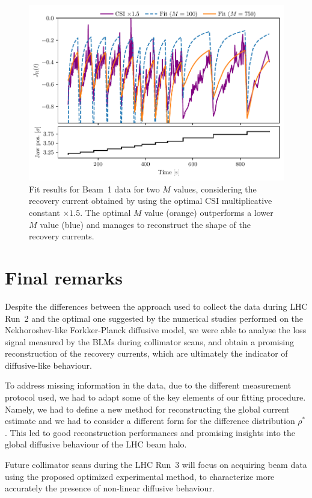 \begin{figure}[hpt]
    \centering
    \includegraphics[trim={0 2.5mm 0 3mm}, clip, width=0.95\columnwidth]{5_Diffusion_measurement_LHC/figs/fifth.pdf}
    \caption{Fit results for Beam~1 data for two $M$ values, considering the recovery current obtained by using the optimal CSI multiplicative constant $\times 1.5$. The optimal $M$ value (orange) outperforms a lower $M$ value (blue) and manages to reconstruct the shape of the recovery currents.}
    \label{fig:fifth}
\end{figure}
%
\section{Final remarks}\label{sec:4:remarks}
%
Despite the differences between the approach used to collect the data during LHC Run~2 and the optimal one suggested by the numerical studies performed on the Nekhoroshev-like Forkker-Planck diffusive model, we were able to analyse the loss signal measured by the BLMs during collimator scans, and obtain a promising reconstruction of the recovery currents, which are ultimately the indicator of diffusive-like behaviour.

To address missing information in the data, due to the different measurement protocol used, we had to adapt some of the key elements of our fitting procedure. Namely, we had to define a new method for reconstructing the global current estimate and we had to consider a different form for the difference distribution $\rho^\ast$. This led to good reconstruction performances and promising insights into the global diffusive behaviour of the LHC beam halo.

Future collimator scans during the LHC Run~3 will focus on acquiring beam data using the proposed optimized experimental method, to characterize more accurately the presence of non-linear diffusive behaviour. 
